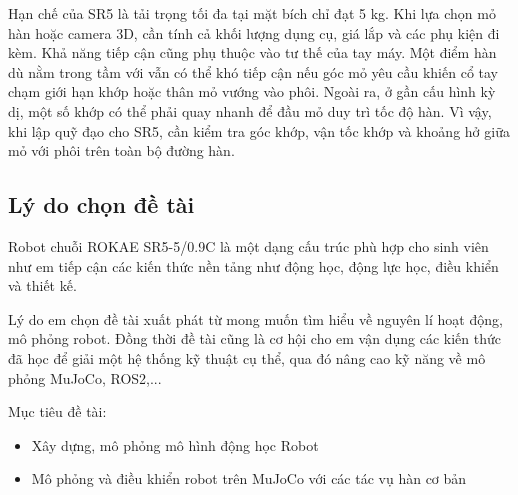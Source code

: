 Hạn chế của SR5 là tải trọng tối đa tại mặt bích chỉ đạt 5 kg. Khi lựa chọn mỏ hàn hoặc camera 3D, cần tính cả khối lượng dụng cụ, giá lắp và các phụ kiện đi kèm. Khả năng tiếp cận cũng phụ thuộc vào tư thế của tay máy. Một điểm hàn dù nằm trong tầm với vẫn có thể khó tiếp cận nếu góc mỏ yêu cầu khiến cổ tay chạm giới hạn khớp hoặc thân mỏ vướng vào phôi. Ngoài ra, ở gần cấu hình kỳ dị, một số khớp có thể phải quay nhanh để đầu mỏ duy trì tốc độ hàn. Vì vậy, khi lập quỹ đạo cho SR5, cần kiểm tra góc khớp, vận tốc khớp và khoảng hở giữa mỏ với phôi trên toàn bộ đường hàn.

\subsection{Lý do chọn đề tài}

Robot chuỗi ROKAE SR5-5/0.9C là một dạng cấu trúc phù hợp cho sinh viên như em tiếp cận các kiến thức nền tảng như động học, động lực học, điều khiển và thiết kế.

Lý do em chọn đề tài xuất phát từ mong muốn tìm hiểu về nguyên lí hoạt động, mô phỏng robot. Đồng thời đề tài cũng là cơ hội cho em vận dụng các kiến thức đã học để giải một hệ thống kỹ thuật cụ thể, qua đó nâng cao kỹ năng về mô phỏng MuJoCo, ROS2,...

Mục tiêu đề tài:

\begin{itemize}

\item Xây dựng, mô phỏng mô hình động học Robot

\item Mô phỏng và điều khiển robot trên MuJoCo với các tác vụ hàn cơ bản

\end{itemize}

